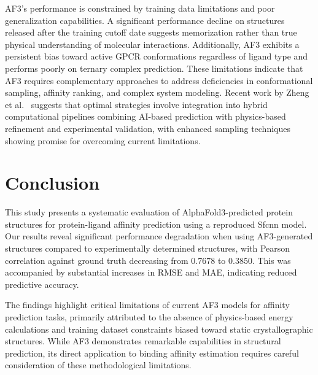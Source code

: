 \documentclass[unnumsec,webpdf,contemporary,large]{oup-authoring-template}
\theoremstyle{thmstyleone}%
\theoremstyle{thmstyletwo}%
\theoremstyle{thmstylethree}%
\begin{document}
AF3's performance is constrained by training data limitations and poor generalization 
capabilities. A significant performance decline on structures released after 
the training cutoff date suggests memorization rather than true physical 
understanding of molecular interactions. Additionally, AF3 exhibits a 
persistent bias toward active GPCR conformations regardless of ligand type 
and performs poorly on ternary complex prediction. These limitations 
indicate that AF3 requires complementary approaches to address deficiencies 
in conformational sampling, affinity ranking, and complex system modeling. 
Recent work by Zheng et al.~\cite{Zheng2025.04.07.647682} suggests that optimal 
strategies involve integration into hybrid computational pipelines combining 
AI-based prediction with physics-based refinement and experimental validation, 
with enhanced sampling techniques showing promise for overcoming current limitations.


\section{Conclusion}
This study presents a systematic evaluation of AlphaFold3-predicted protein structures 
for protein-ligand affinity prediction using a reproduced Sfcnn model. 
Our results reveal significant performance degradation when using AF3-generated structures 
compared to experimentally determined structures, with Pearson correlation against ground truth decreasing from 
0.7678 to 0.3850. 
This was accompanied by substantial increases in RMSE and MAE, indicating reduced predictive accuracy.

The findings highlight critical limitations of current AF3 models for affinity prediction tasks, 
primarily attributed to the absence of physics-based energy calculations and training dataset 
constraints biased toward static crystallographic structures. While AF3 demonstrates remarkable 
capabilities in structural prediction, its direct application to binding affinity estimation 
requires careful consideration of these methodological limitations.
\end{document}
